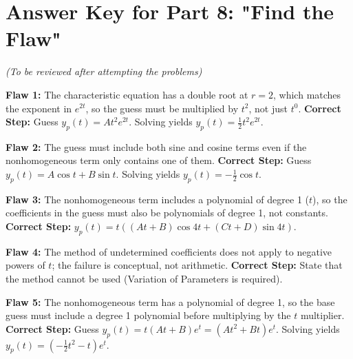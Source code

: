 \documentclass[12pt]{article}
\begin{document}
\newpage
\section*{Answer Key for Part 8: "Find the Flaw"}
\textit{(To be reviewed after attempting the problems)}

\textbf{Flaw 1:} The characteristic equation has a double root at $r=2$, which matches the exponent in $e^{2t}$, so the guess must be multiplied by $t^2$, not just $t^0$.
\textbf{Correct Step:} Guess $y_p(t) = A t^2 e^{2t}$. Solving yields $y_p(t) = \frac{1}{2} t^2 e^{2t}$.

\textbf{Flaw 2:} The guess must include both sine and cosine terms even if the nonhomogeneous term only contains one of them.
\textbf{Correct Step:} Guess $y_p(t) = A \cos t + B \sin t$. Solving yields $y_p(t) = -\frac{1}{2} \cos t$.

\textbf{Flaw 3:} The nonhomogeneous term includes a polynomial of degree 1 ($t$), so the coefficients in the guess must also be polynomials of degree 1, not constants.
\textbf{Correct Step:} $y_p(t) = t ((At + B)\cos 4t + (Ct + D)\sin 4t)$.

\textbf{Flaw 4:} The method of undetermined coefficients does not apply to negative powers of $t$; the failure is conceptual, not arithmetic.
\textbf{Correct Step:} State that the method cannot be used (Variation of Parameters is required).

\textbf{Flaw 5:} The nonhomogeneous term has a polynomial of degree 1, so the base guess must include a degree 1 polynomial before multiplying by the $t$ multiplier.
\textbf{Correct Step:} Guess $y_p(t) = t(At + B)e^t = (At^2 + Bt)e^t$. Solving yields $y_p(t) = \left(-\frac{1}{2}t^2 - t\right)e^t$.
\end{document}
